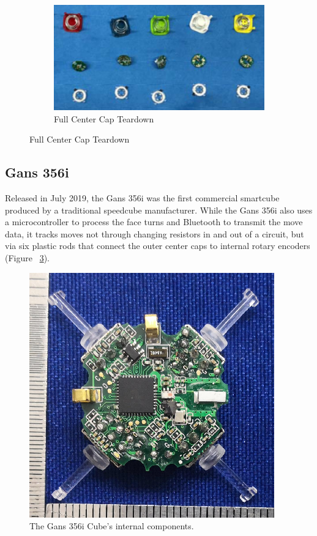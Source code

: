 \begin{figure}[h]
\begin{subfigure}{0.25\textwidth}
    \end{subfigure}%
    \begin{subfigure}{0.50\textwidth}
        \centering
        \caption{Full Center Cap Teardown}
        \label{fig:gocube-centers}
        \includegraphics[width=.90\linewidth]{Figures/3 State of the Art/gocube-centers.png}
    \end{subfigure}%
\end{figure}

\subsection{Gans 356i}
Released in July 2019, the Gans 356i was the first commercial smartcube produced by a traditional speedcube manufacturer. \cite{gans356i-thecubicle}
While the Gans 356i also uses a microcontroller to process the face turns and Bluetooth to transmit the move data, it tracks moves not through changing resistors in and out of a circuit, but via six plastic rods that connect the outer center caps to internal rotary encoders (Figure ~\ref{fig:gans356i-core}).

\begin{figure}[h]
    \centering
    \caption[Gans 356i Teardown]{The Gans 356i Cube's internal components. \cite{gans-356i-internals}}
    \label{fig:gans356i-core}
    \includegraphics{Figures/3 State of the Art/gans356i-core.png}
\end{figure}


